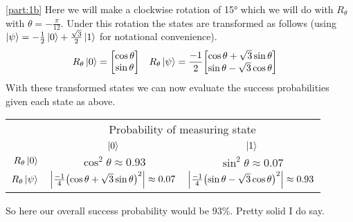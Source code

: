 \documentclass[boxes]{homework}
\begin{document}
\begin{solution}
	\ref{part:1b}
	Here we will make a clockwise rotation of \ang{15} which we will do with $R_\theta$ with $\theta = -\frac{\pi}{12}$. Under this rotation the states are transformed as follows (using $\ket{\psi} = -\frac{1}{2}\ket{0} + \frac{\sqrt{3}}{2}\ket{1}$ for notational convenience).
	\begin{align*}
		R_{\theta}\ket{0} &= \mqty[\cos\theta \\ \sin\theta] & R_{\theta}\ket{\psi} &= \frac{-1}{2}\mqty[\cos\theta + \sqrt{3}\sin\theta \\ \sin\theta - \sqrt{3}\cos\theta]
	\end{align*}
	With these transformed states we can now evaluate the success probabilities given each state as above.
	\begin{center}
		\begin{tabular}{ r | c | c }
			& \multicolumn{2}{c}{Probability of measuring state} \\
			                     & $\ket{0}$                                                               & $\ket{1}$                                                               \\ \midrule
			$R_\theta\ket{0}$    & $\cos^2\theta\approx 0.93$                                              & $\sin^2\theta\approx 0.07$                                              \\
			$R_\theta\ket{\psi}$ & $\abs{\frac{-1}{4}\qty(\cos\theta + \sqrt{3}\sin\theta)^2}\approx 0.07$ & $\abs{\frac{-1}{4}\qty(\sin\theta - \sqrt{3}\cos\theta)^2}\approx 0.93$
		\end{tabular}
	\end{center}
	So here our overall success probability would be $93\%$. Pretty solid I do say.


\end{solution}
\end{document}
